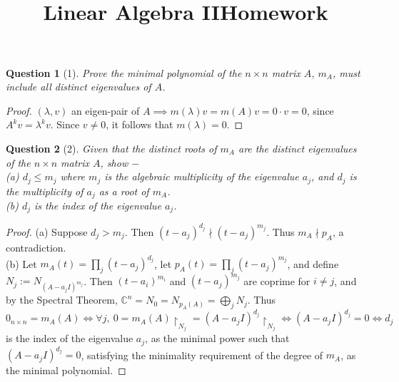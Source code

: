 \documentclass[11pt]{article}
\title{\vspace{-50pt}
\Huge \name
\\\vspace{20pt}
\huge Linear Algebra II\hfill Homework \hw}
\author{}
\date{}
\theoremstyle{quest}
\newtheorem*{question}{Question}
\begin{document}
\maketitle

\begin{question}[1]
Prove the minimal polynomial of the $n \times n$ matrix $A$, $m_A$, must include all distinct eigenvalues of $A$.
\end{question}
\begin{proof}
$(\lambda, v)$ an eigen-pair of $A \implies m(\lambda)v = m(A)v = 0 \cdot v = 0$, since $A^k v = \lambda^k v$. Since $v \ne 0$, it follows that $m(\lambda) = 0$.
\end{proof}
\begin{question}[2]
Given that the distinct roots of $m_A$ are the distinct eigenvalues of the $n \times n$ matrix $A$, show $-$
\\(a) $d_j \le m_j$ where $m_j$ is the algebraic multiplicity of the eigenvalue $a_j$, and $d_j$ is the multiplicity of $a_j$ as a root of  $m_A$.
\\(b) $d_j$ is the index of the eigenvalue $a_j$.
\end{question}
\begin{proof}
(a) Suppose $d_j > m_j$. Then $(t - a_j)^{d_j} \nmid (t - a_j)^{m_j}$. Thus $m_A \nmid p_A$, a contradiction.
\\(b) Let $m_A(t) = \prod_j(t-a_j)^{d_j}$,  let $p_A(t) = \prod_j(t-a_j)^{m_j}$,  and define $N_j := N_{(A-a_jI)^{m_j}}$. Then $(t-a_i)^{m_i}$ and $(t-a_j)^{m_j}$ are coprime for $i \ne j$, and by the Spectral Theorem, $\mathbb{C}^n = N_0 = N_{p_A(A)} = \bigoplus_j N_j$. Thus $0_{n \times n} = m_A(A) \iff \forall j, \ 0 = m_A(A) \restriction_{N_j} = (A - a_jI)^{d_j} \restriction_{N_j} \iff (A - a_jI)^{d_j} = 0 \iff d_j$ is the index of the eigenvalue $a_j$, as the minimal power such that $(A - a_jI)^{d_j} = 0$, satisfying the minimality requirement of the degree of $m_A$, as the minimal polynomial.
\end{proof}
\end{document}
